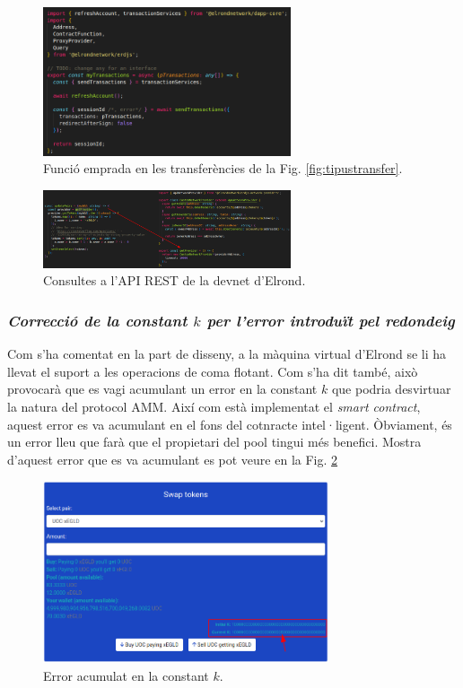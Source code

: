 \documentclass[11pt,a4paper]{article}
\begin{document}
\begin{figure}[h]
\includegraphics[width=0.65\textwidth]{imp-mytransactions.png}
\centering
\caption{Funció emprada en les transferències de la Fig. \ref{fig:tipustransfer}.}
\end{figure} 

\begin{figure}[h]
\includegraphics[width=0.65\textwidth]{imp-queryapirest.png}
\centering
\caption{Consultes a l'API REST de la devnet d'Elrond.}\label{fig:imp-queryapirest}
\end{figure} 

\subsubsection{\textit{Correcció de la constant \(k\) per l'error introduït pel redondeig}}
Com s'ha comentat en la part de disseny, a la màquina virtual d'Elrond se li ha llevat el suport a les operacions de coma flotant. Com s'ha dit també, això provocarà que es vagi acumulant un error en la constant \(k\) que podria desvirtuar la natura del protocol AMM. Així com està implementat el \textit{smart contract}, aquest error es va acumulant en el fons del cotnracte intel·ligent. Òbviament, és un error lleu que farà que el propietari del pool tingui més benefici. Mostra d'aquest error que es va acumulant es pot veure en la Fig. \ref{fig:imperrork}

\begin{figure}[h]
\includegraphics[width=0.75\textwidth]{imp-errork.png}
\centering
\caption{Error acumulat en la constant \(k\).}\label{fig:imperrork}
\end{figure} 
\end{document}
